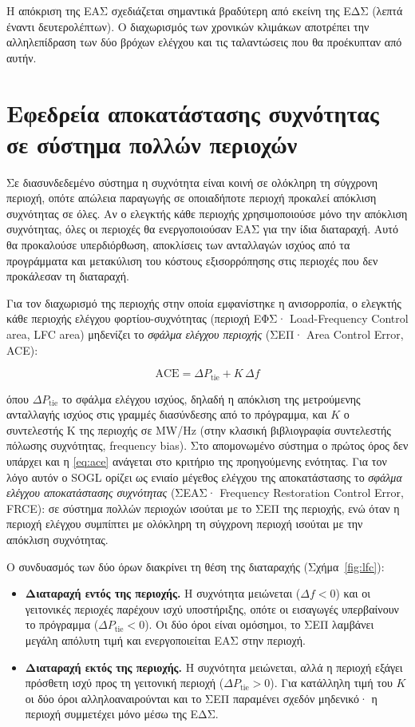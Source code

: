 Η απόκριση της ΕΑΣ σχεδιάζεται σημαντικά βραδύτερη από εκείνη της ΕΔΣ (λεπτά έναντι
δευτερολέπτων). Ο διαχωρισμός των χρονικών κλιμάκων αποτρέπει την αλληλεπίδραση των δύο
βρόχων ελέγχου και τις ταλαντώσεις που θα προέκυπταν από αυτήν.

\section{Εφεδρεία αποκατάστασης συχνότητας σε σύστημα πολλών περιοχών}
\label{sec:frr-multi}

Σε διασυνδεδεμένο σύστημα η συχνότητα είναι κοινή σε ολόκληρη τη σύγχρονη περιοχή,
οπότε απώλεια παραγωγής σε οποιαδήποτε περιοχή προκαλεί απόκλιση συχνότητας σε όλες. Αν ο
ελεγκτής κάθε περιοχής χρησιμοποιούσε μόνο την απόκλιση συχνότητας, όλες οι περιοχές θα
ενεργοποιούσαν ΕΑΣ για την ίδια διαταραχή. Αυτό θα προκαλούσε υπερδιόρθωση, αποκλίσεις των
ανταλλαγών ισχύος από τα προγράμματα και μετακύλιση του κόστους εξισορρόπησης στις περιοχές
που δεν προκάλεσαν τη διαταραχή.

Για τον διαχωρισμό της περιοχής στην οποία εμφανίστηκε η ανισορροπία, ο ελεγκτής κάθε
περιοχής ελέγχου φορτίου-συχνότητας (περιοχή ΕΦΣ· Load-Frequency Control area, LFC area) μηδενίζει το \emph{σφάλμα ελέγχου
περιοχής} (ΣΕΠ· Area Control Error, ACE):

\begin{equation}
\mathrm{ACE} = \Delta P_{\mathrm{tie}} + K \, \Delta f
\label{eq:ace}
\end{equation}

όπου $\Delta P_{\mathrm{tie}}$ το σφάλμα ελέγχου ισχύος, δηλαδή η απόκλιση της μετρούμενης
ανταλλαγής ισχύος στις γραμμές διασύνδεσης από το πρόγραμμα, και $K$ ο συντελεστής K της
περιοχής σε MW/Hz (στην κλασική βιβλιογραφία συντελεστής πόλωσης συχνότητας, frequency
bias). Στο απομονωμένο σύστημα ο πρώτος όρος δεν υπάρχει και η \eqref{eq:ace} ανάγεται στο
κριτήριο της προηγούμενης ενότητας. Για τον λόγο αυτόν ο SOGL ορίζει ως ενιαίο μέγεθος
ελέγχου της αποκατάστασης το \emph{σφάλμα ελέγχου αποκατάστασης συχνότητας} (ΣΕΑΣ·
Frequency Restoration Control Error, FRCE): σε σύστημα πολλών περιοχών ισούται με το ΣΕΠ
της περιοχής, ενώ όταν η περιοχή ελέγχου συμπίπτει με ολόκληρη τη σύγχρονη περιοχή
ισούται με την απόκλιση συχνότητας.

Ο συνδυασμός των δύο όρων διακρίνει τη θέση της διαταραχής (Σχήμα~\ref{fig:lfc}):

\begin{itemize}
\item \textbf{Διαταραχή εντός της περιοχής.} Η συχνότητα μειώνεται ($\Delta f < 0$) και οι
      γειτονικές περιοχές παρέχουν ισχύ υποστήριξης, οπότε οι εισαγωγές υπερβαίνουν το
      πρόγραμμα ($\Delta P_{\mathrm{tie}} < 0$). Οι δύο όροι είναι ομόσημοι, το ΣΕΠ λαμβάνει
      μεγάλη απόλυτη τιμή και ενεργοποιείται ΕΑΣ στην περιοχή.
\item \textbf{Διαταραχή εκτός της περιοχής.} Η συχνότητα μειώνεται, αλλά η περιοχή εξάγει
      πρόσθετη ισχύ προς τη γειτονική περιοχή ($\Delta P_{\mathrm{tie}} > 0$). Για κατάλληλη
      τιμή του $K$ οι δύο όροι αλληλοαναιρούνται και το ΣΕΠ παραμένει σχεδόν μηδενικό· η
      περιοχή συμμετέχει μόνο μέσω της ΕΔΣ.
\end{itemize}

